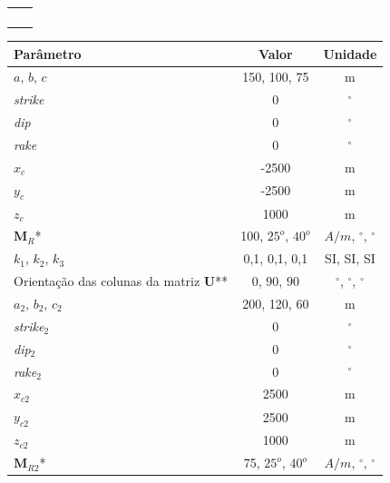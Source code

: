 \begin{table}[h!]
	\begin{center}
		\begin{tabular}{lc}
			
			&  \\
			&  \\
			&  \\
			&  \\
		\end{tabular}
	\end{center}
\end{table}

\begin{table}[h!]
	\begin{center}
		\begin{tabular}{|l|c|c|}
			\hline
			\textbf{Parâmetro}  & \textbf{Valor}  & \textbf{Unidade}\\
			\hline 
			$a$, $b$, $c$   & 150, 100, 75 & m\\
			\hline
			\textit{strike}   & $0$ & $^{\circ}$\\
			\hline
			\textit{dip}    & $0$ & $^{\circ}$\\
			\hline
			\textit{rake}   & $0$  & $^{\circ}$\\
			\hline
			$x_c$   & -2500  & m\\
			\hline          
			$y_c$   & -2500  & m\\
			\hline                
			$z_c$  & 1000  & m\\
			\hline
			$\mathbf{M}_{R}$*  & 100, $25^o$, $40^o$  & $A/m$, $^{\circ}$, $^{\circ}$\\
			\hline
			$k_1$, $k_2$, $k_3$   & 0,1, 0,1, 0,1  & SI, SI, SI\\
			\hline
			Orientação das colunas da matriz $\mathbf{U}$**   & $0$, $90$, $90$  & $^{\circ}$, $^{\circ}$, $^{\circ}$\\
			\hline 
			$a_2$, $b_2$, $c_2$   & 200, 120, 60 & m\\
			\hline
			\textit{strike}$_2$   & $0$ & $^{\circ}$\\
			\hline
			\textit{dip}$_2$    & $0$ & $^{\circ}$\\
			\hline
			\textit{rake}$_2$   & $0$  & $^{\circ}$\\
			\hline
			$x_{c2}$   & 2500  & m\\
			\hline          
			$y_{c2}$   & 2500  & m\\
			\hline                
			$z_{c2}$   & 1000  & m\\
			\hline
			$\mathbf{M}_{R2}$*  & 75, $25^o$, $40^o$  & $A/m$, $^{\circ}$, $^{\circ}$\\

\end{tabular}
\end{center}
\end{table}
